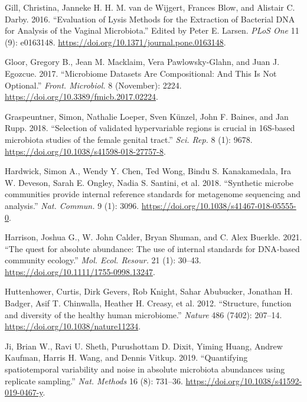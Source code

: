 \documentclass[
]{article}
\newlength{\cslhangindent}
\newlength{\cslentryspacingunit} %
\newenvironment{CSLReferences}[2] %
 {%
  \setlength{\parindent}{0pt}
  \ifodd #1
  \let\oldpar\par
  \def\par{\hangindent=\cslhangindent\oldpar}
  \fi
  \setlength{\parskip}{#2\cslentryspacingunit}
 }%
 {}
\begin{document}
\begin{CSLReferences}{1}{0}
\leavevmode{}%
Gill, Christina, Janneke H. H. M. van de Wijgert, Frances Blow, and Alistair C. Darby. 2016. {``{Evaluation of Lysis Methods for the Extraction of Bacterial DNA for Analysis of the Vaginal Microbiota}.''} Edited by Peter E. Larsen. \emph{PLoS One} 11 (9): e0163148. \url{https://doi.org/10.1371/journal.pone.0163148}.

\leavevmode{}%
Gloor, Gregory B., Jean M. Macklaim, Vera Pawlowsky-Glahn, and Juan J. Egozcue. 2017. {``{Microbiome Datasets Are Compositional: And This Is Not Optional}.''} \emph{Front. Microbiol.} 8 (November): 2224. \url{https://doi.org/10.3389/fmicb.2017.02224}.

\leavevmode{}%
Graspeuntner, Simon, Nathalie Loeper, Sven Künzel, John F. Baines, and Jan Rupp. 2018. {``{Selection of validated hypervariable regions is crucial in 16S-based microbiota studies of the female genital tract}.''} \emph{Sci. Rep.} 8 (1): 9678. \url{https://doi.org/10.1038/s41598-018-27757-8}.

\leavevmode{}%
Hardwick, Simon A., Wendy Y. Chen, Ted Wong, Bindu S. Kanakamedala, Ira W. Deveson, Sarah E. Ongley, Nadia S. Santini, et al. 2018. {``{Synthetic microbe communities provide internal reference standards for metagenome sequencing and analysis}.''} \emph{Nat. Commun.} 9 (1): 3096. \url{https://doi.org/10.1038/s41467-018-05555-0}.

\leavevmode{}%
Harrison, Joshua G., W. John Calder, Bryan Shuman, and C. Alex Buerkle. 2021. {``{The quest for absolute abundance: The use of internal standards for DNA‐based community ecology}.''} \emph{Mol. Ecol. Resour.} 21 (1): 30--43. \url{https://doi.org/10.1111/1755-0998.13247}.

\leavevmode{}%
Huttenhower, Curtis, Dirk Gevers, Rob Knight, Sahar Abubucker, Jonathan H. Badger, Asif T. Chinwalla, Heather H. Creasy, et al. 2012. {``{Structure, function and diversity of the healthy human microbiome}.''} \emph{Nature} 486 (7402): 207--14. \url{https://doi.org/10.1038/nature11234}.

\leavevmode{}%
Ji, Brian W., Ravi U. Sheth, Purushottam D. Dixit, Yiming Huang, Andrew Kaufman, Harris H. Wang, and Dennis Vitkup. 2019. {``{Quantifying spatiotemporal variability and noise in absolute microbiota abundances using replicate sampling}.''} \emph{Nat. Methods} 16 (8): 731--36. \url{https://doi.org/10.1038/s41592-019-0467-y}.


\end{CSLReferences}
\end{document}
